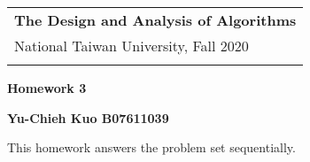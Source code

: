 \documentclass[a4paper,12pt]{article}
\begin{document}
\thispagestyle{plain} %

\begin{tabular}{p{15.5cm}} %
{\large \bf The Design and Analysis of Algorithms} \\
National Taiwan University, Fall 2020  \\
\hline %
\\
\end{tabular} %

\vspace*{0.3cm} %

\begin{center} %
	{\Large \bf Homework 3 } %
	\vspace{2mm}
	
	{\bf Yu-Chieh Kuo B07611039} %
		
\end{center}  
\vspace{0.4cm}

This homework answers the problem set sequentially. 
\end{document}
